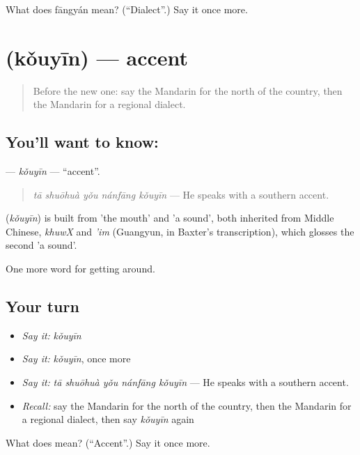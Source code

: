 \begin{tcolorbox}[breakable,colback=teal!4,colframe=teal!35!black,title={Before you move on}]
What does fāngyán mean? (\textquotedblleft{}Dialect\textquotedblright{}.) Say it once more.
\end{tcolorbox}
\section[\texorpdfstring{\zh{口音} (kǒuyīn)}{口音 (kǒuyīn)}]{ (kǒuyīn) — accent}

\label{lesson:ZH-C436-kouyin}



\begin{quote}
Before the new one: say the Mandarin for the north of the country, then the Mandarin for a regional dialect.
\end{quote}

\subsection*{You'll want to know: }
\textbf{} — \emph{kǒuyīn} — \textquotedblleft{}accent\textquotedblright{}.

\begin{quote}
\textbf{} \emph{tā shuōhuà yǒu nánfāng kǒuyīn} — He speaks with a southern accent.
\end{quote}

\begin{cousinweb}
\textbf{} (\emph{kǒuyīn}) is built from  'the mouth' and  'a sound', both inherited from Middle Chinese, \emph{khuwX} and \emph{'im} (Guangyun, in Baxter's transcription), which glosses the second 'a sound'.
\end{cousinweb}

\begin{grammarlens}[title={What you've built}]
One more word for getting around.
\end{grammarlens}

\subsection*{Your turn}
\begin{itemize}
\raggedright
  \item \emph{Say it:} \emph{kǒuyīn}
  \item \emph{Say it:} \emph{kǒuyīn}, once more
  \item \emph{Say it:} \emph{tā shuōhuà yǒu nánfāng kǒuyīn} — He speaks with a southern accent.
  \item \emph{Recall:} say the Mandarin for the north of the country, then the Mandarin for a regional dialect, then say \emph{kǒuyīn} again
\end{itemize}

\begin{tcolorbox}[breakable,colback=teal!4,colframe=teal!35!black,title={Before you move on}]
What does  mean? (\textquotedblleft{}Accent\textquotedblright{}.) Say it once more.
\end{tcolorbox}
